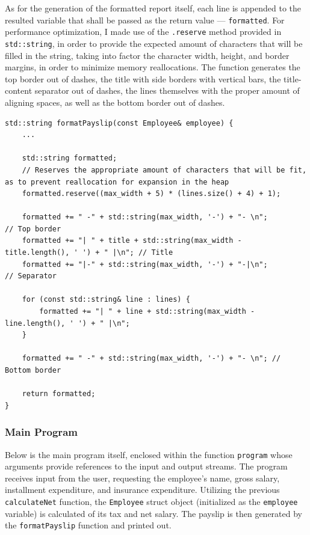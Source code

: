 \documentclass[12pt]{article}
\begin{document}
As for the generation of the formatted report itself, each line is appended to the resulted variable that shall be passed as the return value --- \texttt{formatted}. For performance optimization, I made use of the \texttt{.reserve} method provided in \texttt{std::string}, in order to provide the expected amount of characters that will be filled in the string, taking into factor the character width, height, and border margins, in order to minimize memory reallocations. The function generates the top border out of dashes, the title with side borders with vertical bars, the title-content separator out of dashes, the lines themselves with the proper amount of aligning spaces, as well as the bottom border out of dashes.

\begin{verbatim}
std::string formatPayslip(const Employee& employee) {
    ...

    std::string formatted;
    // Reserves the appropriate amount of characters that will be fit, as to prevent reallocation for expansion in the heap
    formatted.reserve((max_width + 5) * (lines.size() + 4) + 1);

    formatted += " -" + std::string(max_width, '-') + "- \n";                          // Top border
    formatted += "| " + title + std::string(max_width - title.length(), ' ') + " |\n"; // Title
    formatted += "|-" + std::string(max_width, '-') + "-|\n";                          // Separator

    for (const std::string& line : lines) {
        formatted += "| " + line + std::string(max_width - line.length(), ' ') + " |\n";
    }

    formatted += " -" + std::string(max_width, '-') + "- \n"; // Bottom border

    return formatted;
}
\end{verbatim}

\subsubsection{Main Program}

Below is the main program itself, enclosed within the function \texttt{program} whose arguments provide references to the input and output streams. The program receives input from the user, requesting the employee's name, gross salary, installment expenditure, and insurance expenditure. Utilizing the previous \texttt{calculateNet} function, the \texttt{Employee} struct object (initialized as the \texttt{employee} variable) is calculated of its tax and net salary. The payslip is then generated by the \texttt{formatPayslip} function and printed out.
\end{document}
